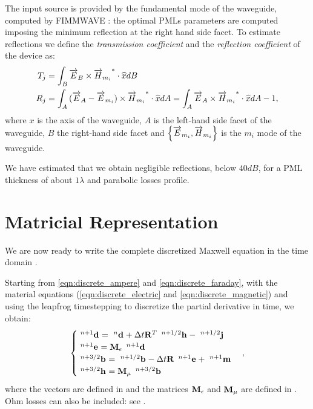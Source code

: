The input source is provided by the fundamental mode of the waveguide,
computed by FIMMWAVE \cite{fimmwave}: the optimal PMLs
parameters are computed imposing the minimum reflection at the right
hand side facet. To estimate reflections we define the \emph{transmission
coefficient} and the \emph{reflection coefficient} of the device as:
\begin{align*}
  T_j & = \int_B \DotProd{\CrossProd{\E_B}{\Conj{\H_{m_i}}}}{\Versor{x}} dB \\
  R_j & = \int_A
  \DotProd{\CrossProd{(\E_A-\E_{m_i})}{\Conj{\H_{m_i}}}}{\Versor{x}} dA = \int_A
  \DotProd{\CrossProd{\E_A}{\Conj{\H_{m_i}}}}{\Versor{x}} dA - 1,
\end{align*}
where $x$ is the axis of the waveguide, $A$ is the left-hand side
facet of the waveguide, $B$ the right-hand side facet and
$\left\{\E_{m_i},\H_{m_i}\right\}$ is the $m_i$ mode of the waveguide.

We have estimated that we obtain negligible reflections, below $40
dB$, for a PML thickness of about $1 \lambda$ and parabolic losses
profile.

\section{Matricial Representation}

We are now ready to write the complete discretized Maxwell equation in
the time domain \cite{trevisan_geometric}.

Starting from \eqref{eqn:discrete_ampere} and
\eqref{eqn:discrete_faraday}, with the material equations
(\eqref{eqn:discrete_electric} and \eqref{eqn:discrete_magnetic}) and
using the leapfrog timestepping to discretize the partial derivative
in time, we obtain:
\begin{equation} \label{eqn:maxwell_time_domain} \begin{cases} 
    \Disc{\Array{d}}{}{n+1} = \Disc{\Array{d}}{}{n} + \deltat
    \Prod{\Transpose{\Matrix{R}}}{\Disc{\Array{h}}{}{n+1/2}} - \Disc{\Array{j}}{}{n+1/2} \\
    \Disc{\Array{e}}{}{n+1} = \Prod{\Matrix{M}_\epsilon}{\Disc{\Array{d}}{}{n+1}} \\
    \Disc{\Array{b}}{}{n+3/2} = \Disc{\Array{b}}{}{n+1/2} - \deltat
    \Prod{\Matrix{R}}{\Disc{\Array{e}}{}{n+1}} + \Disc{\Array{m}}{}{n+1} \\
    \Disc{\Array{h}}{}{n+3/2} = \Prod{\Matrix{M}_\mu}{\Disc{\Array{b}}{}{n+3/2}}
\end{cases} , \end{equation}
where the vectors are defined in  and
the matrices $\Matrix{M}_\epsilon$ and $\Matrix{M}_\mu$ are defined in
. Ohm losses can also be included: see
.

